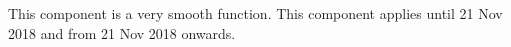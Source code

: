 This component is a very smooth function.
This component applies until 21 Nov 2018 and from 21 Nov 2018 onwards.
